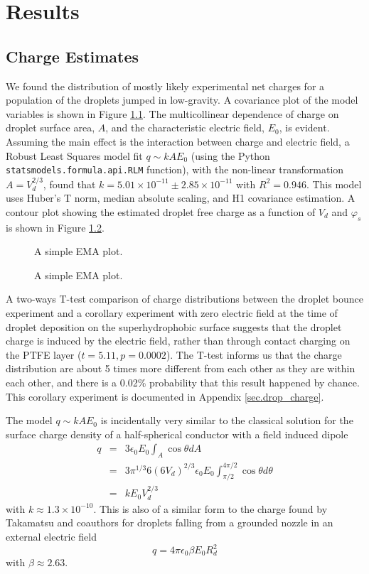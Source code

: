 \documentclass[12pt,a4paper,oneside]{book}
\begin{document}
\chapter{Results}
\section{Charge Estimates}
We found the distribution of mostly likely experimental net charges for a population of the droplets jumped in low-gravity. A covariance plot of the model variables is shown in Figure \ref{fig:scatter}. The multicollinear dependence of charge on droplet surface area, $A$, and the characteristic electric field, $E_0$, is evident. Assuming the main effect is the interaction between charge and electric field, a Robust Least Squares model fit $q \sim kAE_0$ (using the Python \verb|statsmodels.formula.api.RLM| function), with the non-linear transformation $A = V_d^{2/3}$, found that $k=5.01 \times 10^{-11} \pm  2.85 \times 10^{-11}$ with $R^2 = 0.946$. This model uses Huber's T norm, median absolute scaling, and H1 covariance estimation. A contour plot showing the estimated droplet free charge as a function of $V_d$ and $\varphi_s$ is shown in Figure \ref{fig:charge}.
\begin{figure}[htb]
    \centering
    \resizebox{12cm}{!}{}
    \caption{A simple EMA plot.\label{fig:scatter}}
\end{figure}
\begin{figure}[htb]
    \centering
    
    \caption{A simple EMA plot.\label{fig:charge}}
\end{figure}

A two-ways T-test comparison of charge distributions between the droplet bounce experiment and a corollary experiment with zero electric field at the time of droplet deposition on the superhydrophobic surface suggests that the droplet charge is induced by the electric field, rather than through contact charging on the PTFE layer ($t = 5.11, p = 0.0002$). The T-test informs us that the charge distribution  are about 5 times more different from each other as they are within each other, and there is a 0.02$\%$ probability that this result happened by chance. This corollary experiment is documented in Appendix \ref{sec.drop_charge}.

The model $q \sim kAE_0$ is incidentally very similar to the classical solution for the surface charge density of a half-spherical conductor with a field induced dipole \cite{david_j._griffiths_introduction_1999}
\begin{eqnarray*}
q &=& 3 \epsilon_0 E_0 \int_A \cos \theta dA \\
&=& 3 \pi^{1/3} 6 \left(6 V_d \right)^{2/3} \epsilon_0 E_0 \int^{4 \pi/2}_{\pi / 2} \cos \theta d\theta \\
&=& k E_0 V_d^{2/3}
\end{eqnarray*}
with $k \approx 1.3 \times 10^{-10}$. This is also of a similar form to the charge found by Takamatsu and coauthors for droplets falling from a grounded nozzle in an external electric field \cite{takamatsu_theoretical_1981}
\[q = 4 \pi \epsilon_0 \beta E_0 R_d^2 \]
with $\beta \approx 2.63$.
\end{document}
